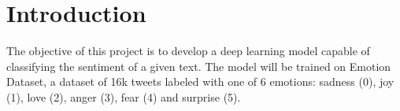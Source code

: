 \section{Introduction}
The objective of this project is to develop a deep learning model capable of classifying the sentiment of a given text.
The model will be trained on Emotion Dataset, a dataset of 16k tweets labeled with one of 6 emotions: sadness (0), joy (1), love (2), anger (3), fear (4) and surprise (5).